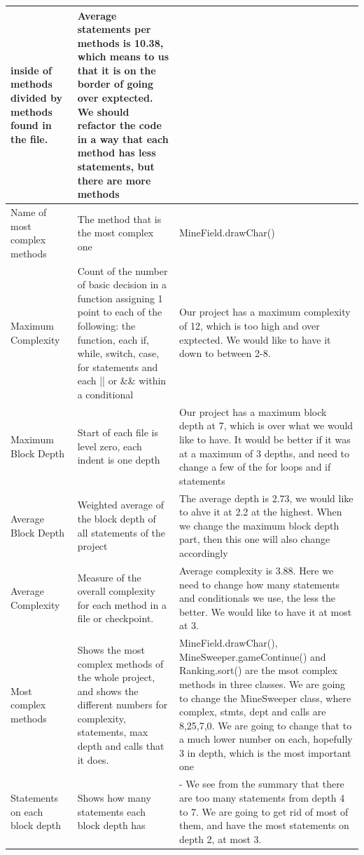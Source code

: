 \documentclass[UKenglish]{article}  %
\begin{document}
\begin{longtable}[H]{| m{1in} |  m{2in} | m{2in} |}
       inside of methods divided by methods found in the file. & Average
       statements per methods is 10.38, which means to us that it is on the
       border of going over exptected. We should refactor the code in a way that
       each method has less statements, but there are more methods \\
       \hline Name of most complex methods & The method that is the most complex
       one & MineField.drawChar()\\
       \hline Maximum Complexity & Count of the number of basic decision in a
       function assigning 1 point to each of the following: the function, each
       if, while, switch, case, for statements and each || or \&\& within a
       conditional & Our project has a maximum complexity of 12, which is too
       high and over exptected. We would like to have it down to between 2-8. \\
       \hline Maximum Block Depth & Start of each file is level zero, each
       indent is one depth & Our project has a maximum block depth at 7, which
       is over what we would like to have. It would be better if it was at a
       maximum of 3 depths, and need to change a few of the for loops and if
       statements \\
       \hline Average Block Depth & Weighted average of the block depth of all
       statements of the project & The average depth is 2.73, we would like to
       ahve it at 2.2 at the highest. When we change the maximum block depth
       part, then this one will also change accordingly \\
       \hline Average Complexity & Measure of the overall complexity for each
       method in a file or checkpoint. & Average complexity is 3.88. Here we
       need to change how many statements and conditionals we use, the less the
       better. We would like to have it at most at 3.\\
       \hline Most complex methods & Shows the most complex methods of the whole
       project, and shows the different numbers for complexity, statements, max
       depth and calls that it does. & MineField.drawChar(),
       MineSweeper.gameContinue() and Ranking.sort() are the msot complex
       methods in three classes. We are going to change the MineSweeper class,
       where complex, stmts, dept and calls are 8,25,7,0. We are going to change
       that to a much lower number on each, hopefully 3 in depth, which is the
       most important one\\
       \hline Statements on each block depth & Shows how many statements each
       block depth has & - We see from the summary that there are too many
       statements from depth 4 to 7. We are going to get rid of most of them,
       and have the most statements on depth 2, at most 3. \\
       \hline
\end{longtable}
\end{document}
